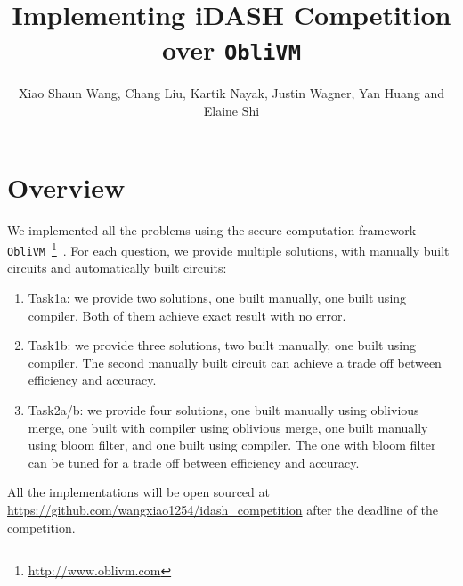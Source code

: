 \documentclass{article}
\title{Implementing iDASH Competition over {\tt ObliVM}}
\author{Xiao Shaun Wang, Chang Liu, Kartik Nayak, Justin Wagner, Yan Huang and Elaine Shi}
\begin{document}
\maketitle
\section{Overview}
We implemented all the problems using the secure computation framework {\tt ObliVM}~\footnote{\url{http://www.oblivm.com}}~\cite{oblivm}.
For each question, we provide multiple solutions, with manually built circuits and automatically built circuits:
\begin{enumerate}
\item Task1a: we provide two solutions, one built manually, one built using compiler. Both of them achieve exact result with no error.
\item Task1b: we provide three solutions, two built manually, one built using compiler. The second manually built circuit can achieve a trade off between efficiency and accuracy.
\item Task2a/b: we provide four solutions, one built manually using oblivious merge, one built with compiler using oblivious merge, one built manually using bloom filter, and one built using compiler. The one with bloom filter can be tuned for a trade off between efficiency and accuracy.
\end{enumerate}

All the implementations will be open sourced at \url{https://github.com/wangxiao1254/idash_competition} after the deadline of the competition.




\end{document}
